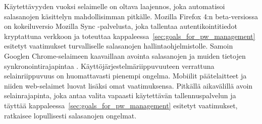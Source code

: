 \documentclass[english,gradu]{tktltiki}
\begin{document}
Käytettävyyden vuoksi selaimelle on oltava laajennos, joka automatisoi salasanojen käsittelyn mahdollisimman
pitkälle. Mozilla Firefox 4:n beta-versiossa on kokeiluversio Mozilla Sync -palvelusta, joka tallentaa
autentikointitiedot kryptattuna verkkoon ja toteuttaa kappaleessa~\ref{sec:goals_for_pw_management} esitetyt
vaatimukset turvalliselle salasanojen hallintaohjelmistolle. Samoin Googlen Chrome-selaimeen kaavaillaan avointa
salasanojen ja muiden tietojen synkronointirajapintaa \cite{chromium_sync_09}. Käyttöjärjestelmäriippuvuuteen
verrattuna selainriippuvuus on huomattavasti pienempi ongelma. Mobiilit päätelaitteet ja niiden web-selaimet
luovat lisäksi omat vaatimuksensa. Pitkällä aikavälillä avoin selainrajapinta, joka antaa valita vapaasti käytettävän tallennuspalvelun ja täyttää kappaleessa~\ref{sec:goals_for_pw_management} esitetyt vaatimukset, ratkaisee lopullisesti salasanojen ongelmat.








\lastpage
\end{document}
